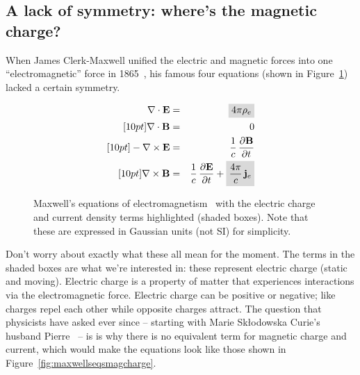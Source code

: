 \newpage

\subsection{A lack of symmetry: where’s the magnetic charge?}
\label{sec:magcharge}
When James Clerk-Maxwell unified the electric and magnetic forces into one
``electromagnetic'' force in 1865~\cite{Maxwell1865},
his famous four equations (shown in Figure~\ref{fig:maxwellseqs})
lacked a certain symmetry.

\begin{figure}[htbp]
  \centering
\begin{eqnarray}
\label{eq:1} \divvec{\electricfield} & = & \highlight{4 \pi \electricchargedensity} \\ [10pt]
\label{eq:2} \divvec{\magneticfield} & = & 0\\ [10pt]
\label{eq:3} - \curlvec{\electricfield} & = & \myfrac{1}{\speedoflight} \, \timediff{\magneticfield}\\ [10pt]
\label{eq:4}   \curlvec{\magneticfield} & = & \myfrac{1}{\speedoflight} \, \timediff{\electricfield} + \highlight{\myfrac{4 \pi}{\speedoflight} \, \electriccurrentdensity}
\end{eqnarray}
  \caption[Maxwell's equations of electromagnetism]
  {\label{fig:maxwellseqs}Maxwell's equations of electromagnetism~\cite{Maxwell1865} with the electric charge and current density terms highlighted (shaded boxes). Note that these are expressed in Gaussian units (not SI) for simplicity.}
\end{figure}

%
Don't worry about exactly what these all mean for the moment.
The terms in the shaded boxes are what we're interested in:
these represent electric charge (static and moving).
Electric charge is a property of matter that experiences
interactions via the electromagnetic force.
Electric charge can be positive or negative; like charges repel
each other while opposite charges attract.
%
The question that physicists have asked ever since -- starting
with Marie Skłodowska Curie's husband Pierre~\cite{Curie1894} -- is
is why there is no equivalent term for magnetic charge and current,
which would make the equations look like those shown in
Figure~\ref{fig:maxwellseqsmagcharge}.

